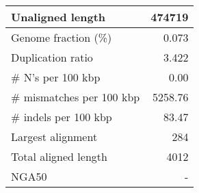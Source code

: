 \documentclass[12pt,a4paper]{article}
\begin{document}
\begin{table}[ht]
\begin{center}
\begin{tabular}{|l*{1}{|r}|}
Unaligned length & 474719 \\ \hline
Genome fraction (\%) & 0.073 \\ \hline
Duplication ratio & 3.422 \\ \hline
\# N's per 100 kbp & 0.00 \\ \hline
\# mismatches per 100 kbp & 5258.76 \\ \hline
\# indels per 100 kbp & 83.47 \\ \hline
Largest alignment & 284 \\ \hline
Total aligned length & 4012 \\ \hline
NGA50 & - \\ \hline
\end{tabular}
\end{center}
\end{table}
\end{document}

